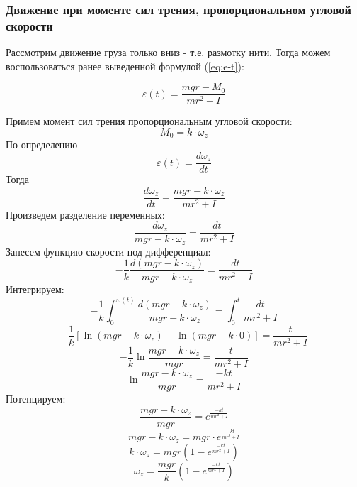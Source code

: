 \documentclass[a4paper,12pt]{article}
\begin{document}
\subsubsection{Движение при моменте сил трения, пропорциональном угловой скорости}

Рассмотрим движение груза только вниз - т.е. размотку нити. Тогда можем воспользоваться ранее выведенной формулой (\ref{eq:e-t}):

\begin{equation*}
	\varepsilon(t)=\frac{mgr-M_0}{mr^2+I}
\end{equation*}

Примем момент сил трения пропорциональным угловой скорости:
\begin{equation}
	M_0=k\cdot\omega_z
\end{equation}
По определению
\begin{equation}
	\varepsilon(t)=\frac{d\omega_z}{dt}
\end{equation}
Тогда
\begin{equation}
	\frac{d\omega_z}{dt}=\frac{mgr-k\cdot\omega_z}{mr^2+I}
\end{equation}
Произведем разделение переменных:
\begin{equation}
	\frac{d\omega_z}{mgr-k\cdot\omega_z}=\frac{dt}{mr^2+I}
\end{equation}
Занесем функцию скорости под дифференциал:
\begin{equation}
	-\frac{1}{k}\frac{d(mgr-k\cdot\omega_z)}{mgr-k\cdot\omega_z}=\frac{dt}{mr^2+I}
\end{equation}
Интегрируем:
\begin{equation}
	-\frac{1}{k}\int_0^{\omega(t)}\frac{d(mgr-k\cdot\omega_z)}{mgr-k\cdot\omega_z}=\int_0^t\frac{dt}{mr^2+I}
\end{equation}
\begin{equation}
	-\frac{1}{k}[\ln(mgr-k\cdot\omega_z)-\ln(mgr-k\cdot0)]=
	\frac{t}{mr^2+I}
\end{equation}
\begin{equation}
	-\frac{1}{k}\ln\frac{mgr-k\cdot\omega_z}{mgr}=
	\frac{t}{mr^2+I}
\end{equation}
\begin{equation}
	\ln\frac{mgr-k\cdot\omega_z}{mgr}=
	\frac{-kt}{mr^2+I}
\end{equation}
Потенцируем:
\begin{equation}
	\frac{mgr-k\cdot\omega_z}{mgr}=
	e^{\frac{-kt}{mr^2+I}}
\end{equation}
\begin{equation}
	{mgr-k\cdot\omega_z}=
	{mgr}\cdot e^{\frac{-kt}{mr^2+I}}
\end{equation}
\begin{equation}
	k\cdot\omega_z=
	{mgr}(1-e^{\frac{-kt}{mr^2+I}})
\end{equation}
\begin{equation}
	\omega_z=
	\frac{mgr}{k}(1-e^{\frac{-kt}{mr^2+I}})
\end{equation}
\end{document}
